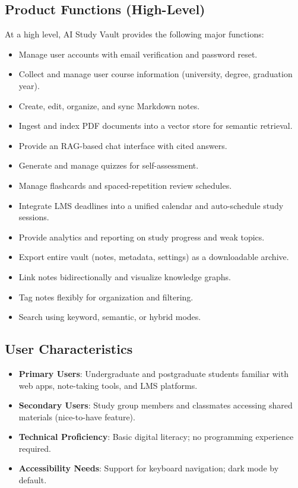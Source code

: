 \documentclass[12pt,a4paper]{article}
\begin{document}
\subsection{Product Functions (High-Level)}

At a high level, AI Study Vault provides the following major functions:

\begin{itemize}
    \item Manage user accounts with email verification and password reset.
    \item Collect and manage user course information (university, degree, graduation year).
    \item Create, edit, organize, and sync Markdown notes.
    \item Ingest and index PDF documents into a vector store for semantic retrieval.
    \item Provide an RAG-based chat interface with cited answers.
    \item Generate and manage quizzes for self-assessment.
    \item Manage flashcards and spaced-repetition review schedules.
    \item Integrate LMS deadlines into a unified calendar and auto-schedule study sessions.
    \item Provide analytics and reporting on study progress and weak topics.
    \item Export entire vault (notes, metadata, settings) as a downloadable archive.
    \item Link notes bidirectionally and visualize knowledge graphs.
    \item Tag notes flexibly for organization and filtering.
    \item Search using keyword, semantic, or hybrid modes.
\end{itemize}

\subsection{User Characteristics}

\begin{itemize}
    \item \textbf{Primary Users}: Undergraduate and postgraduate students familiar with web apps, note-taking tools, and LMS platforms.
    \item \textbf{Secondary Users}: Study group members and classmates accessing shared materials (nice-to-have feature).
    \item \textbf{Technical Proficiency}: Basic digital literacy; no programming experience required.
    \item \textbf{Accessibility Needs}: Support for keyboard navigation; dark mode by default.
\end{itemize}
\end{document}
